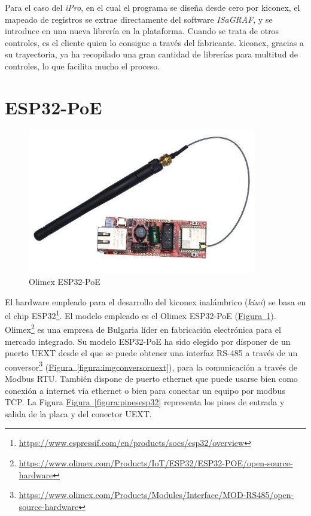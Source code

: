 Para el caso del \textit{iPro}, en el cual el programa se diseña desde cero por kiconex, el mapeado de registros se extrae directamente del software \textit{ISaGRAF}, y se introduce en una nueva librería en la plataforma. Cuando se trata de otros controles, es el cliente quien lo consigue a través del fabricante. kiconex, gracias a su trayectoria, ya ha recopilado una gran cantidad de librerías para multitud de controles, lo que facilita mucho el proceso.

\section{ESP32-PoE}
\label{sec:esp32poe}

\begin{figure}[h]
  \centering
  \includegraphics[width=10cm, keepaspectratio]{img/ESP32-POE}
  \caption{Olimex ESP32-PoE}
  \label{figura:imgesp32}
\end{figure}

El hardware empleado para el desarrollo del kiconex inalámbrico (\textit{kiwi}) se basa en el chip ESP32\footnote{\url{https://www.espressif.com/en/products/socs/esp32/overview}}. El modelo empleado es el Olimex ESP32-PoE (\hyperref[figura:imgesp32]{Figura~\ref{figura:imgesp32}}). Olimex\footnote{\url{https://www.olimex.com/Products/IoT/ESP32/ESP32-POE/open-source-hardware}} es una empresa de Bulgaria líder en fabricación electrónica para el mercado integrado. Su modelo ESP32-PoE ha sido elegido por disponer de un puerto UEXT desde el que se puede obtener una interfaz RS-485 a través de un conversor\footnote{\url{https://www.olimex.com/Products/Modules/Interface/MOD-RS485/open-source-hardware}} (\hyperref[figura:imgconversoruext]{Figura~\ref{figura:imgconversoruext}}), para la comunicación a través de Modbus RTU. También dispone de puerto ethernet que puede usarse bien como conexión a internet vía ethernet o bien para conectar un equipo por modbus TCP. La Figura \hyperref[figura:pinesesp32]{Figura~\ref{figura:pinesesp32}} representa los pines de entrada y salida de la placa y del conector UEXT.

